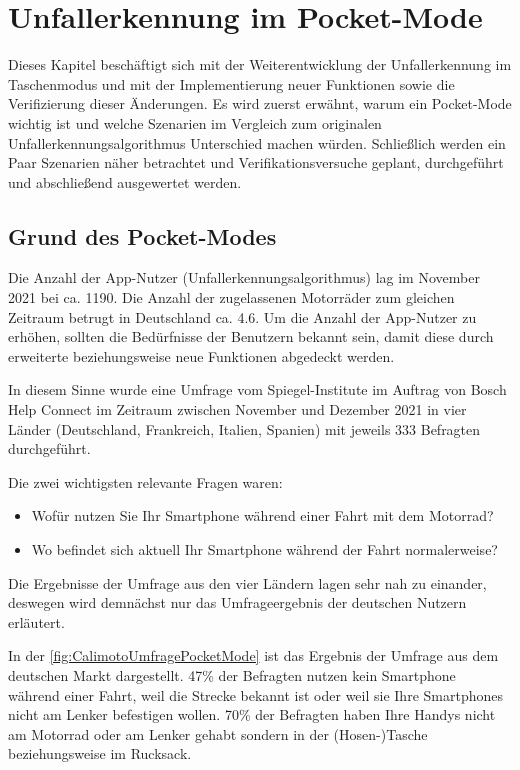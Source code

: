 \chapter{Unfallerkennung im Pocket-Mode}
Dieses Kapitel beschäftigt sich mit der Weiterentwicklung der Unfallerkennung im Taschenmodus und mit der Implementierung neuer Funktionen sowie die Verifizierung dieser Änderungen. Es wird zuerst erwähnt, warum ein Pocket-Mode wichtig ist und welche Szenarien im Vergleich zum originalen Unfallerkennungsalgorithmus Unterschied machen würden.
Schließlich werden ein Paar Szenarien näher betrachtet und Verifikationsversuche geplant, durchgeführt und abschließend ausgewertet werden.

\section{Grund des Pocket-Modes}
Die Anzahl der App-Nutzer (Unfallerkennungsalgorithmus) lag im November 2021 bei ca. 1190. Die Anzahl der zugelassenen Motorräder zum gleichen Zeitraum betrugt in Deutschland ca. \SI{4,6}{\Million}. Um die Anzahl der App-Nutzer zu erhöhen, sollten die Bedürfnisse der Benutzern bekannt sein, damit diese durch erweiterte beziehungsweise neue Funktionen abgedeckt werden.

In diesem Sinne wurde eine Umfrage vom Spiegel-Institute im Auftrag von Bosch Help Connect im Zeitraum zwischen November und Dezember 2021 in vier Länder (Deutschland, Frankreich, Italien, Spanien) mit jeweils 333 Befragten durchgeführt.

Die zwei wichtigsten relevante Fragen waren:
\begin{itemize}
	\item Wofür nutzen Sie Ihr Smartphone während einer Fahrt mit dem Motorrad?
	\item Wo befindet sich aktuell Ihr Smartphone während der Fahrt normalerweise?
\end{itemize}

Die Ergebnisse der Umfrage aus den vier Ländern lagen sehr nah zu einander, deswegen wird demnächst nur das Umfrageergebnis der deutschen Nutzern erläutert.

In der \autoref{fig:CalimotoUmfragePocketMode} ist das Ergebnis der Umfrage aus dem deutschen Markt dargestellt. 47\% der Befragten nutzen kein Smartphone während einer Fahrt, weil die Strecke bekannt ist oder weil sie Ihre Smartphones nicht am Lenker befestigen wollen. 70\% der Befragten haben Ihre Handys nicht am Motorrad oder am Lenker gehabt sondern in der (Hosen-)Tasche beziehungsweise im Rucksack. 

